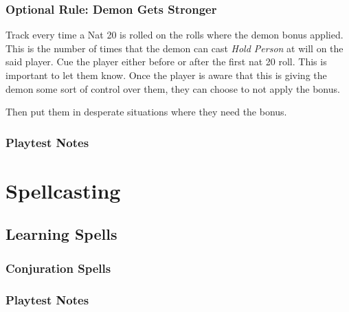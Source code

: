 \documentclass[twocolumn]{dndbook}
\begin{document}
\subsection{Optional Rule: Demon Gets Stronger}
Track every time a Nat 20 is rolled on the rolls where the demon bonus applied.
This is the number of times that the demon can cast \emph{Hold Person} at will on the said player.
Cue the player either before or after the first nat 20 roll.
This is important to let them know.
Once the player is aware that this is giving the demon some sort of control over them, they can choose to not apply the bonus.

Then put them in desperate situations where they need the bonus.\par



\subsection{Playtest Notes}



\chapter{Spellcasting}
\section{Learning Spells}

\subsection{Conjuration Spells}




\subsection{Playtest Notes}
\end{document}
